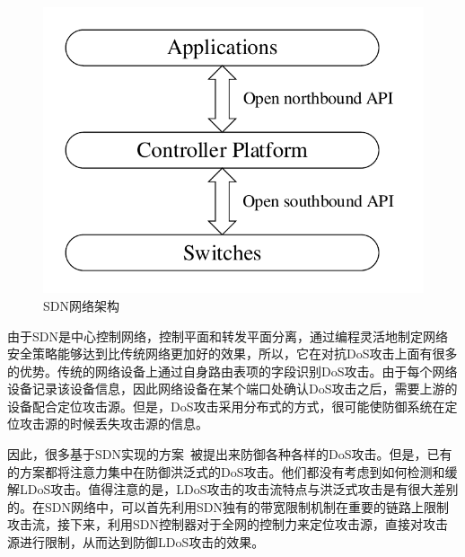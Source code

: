 \begin{figure}
    \centering
    \includegraphics[scale=0.5]{figures/SDN-network}
    \caption{SDN网络架构}
    \label{fig:sdnfig}
\end{figure}

由于SDN是中心控制网络，控制平面和转发平面分离，通过编程灵活地制定网络安全策略能够达到比传统网络更加好的效果，所以，它在对抗DoS攻击上面有很多的优势。传统的网络设备上通过自身路由表项的字段识别DoS攻击。由于每个网络设备记录该设备信息，因此网络设备在某个端口处确认DoS攻击之后，需要上游的设备配合定位攻击源。但是，DoS攻击采用分布式的方式，很可能使防御系统在定位攻击源的时候丢失攻击源的信息。

因此，很多基于SDN实现的方案~\cite{b9, b16, b11, b23, b24}被提出来防御各种各样的DoS攻击。但是，已有的方案都将注意力集中在防御洪泛式的DoS攻击。他们都没有考虑到如何检测和缓解LDoS攻击。值得注意的是，LDoS攻击的攻击流特点与洪泛式攻击是有很大差别的。在SDN网络中，可以首先利用SDN独有的带宽限制机制在重要的链路上限制攻击流，接下来，利用SDN控制器对于全网的控制力来定位攻击源，直接对攻击源进行限制，从而达到防御LDoS攻击的效果。


